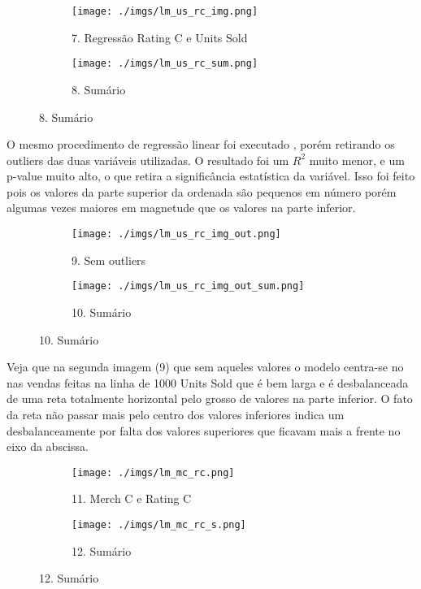 \documentclass[12pt, a4paper]{article}
\begin{document}
\FloatBarrier
\begin{figure}[h]
	\hspace{1cm}
  \begin{subfigure}[b]{0.4\textwidth}
    \texttt{[image: ./imgs/lm\_us\_rc\_img.png]}
    \caption*{7. Regressão Rating C e Units Sold}
    \label{fig:1}
  \end{subfigure}
  \hspace{0.25cm}
  \begin{subfigure}[b]{0.45\textwidth}
    \texttt{[image: ./imgs/lm\_us\_rc\_sum.png]}
    \caption*{8. Sumário}
    \label{fig:2}
  \end{subfigure}
\end{figure}
\FloatBarrier

O mesmo procedimento de regressão linear foi executado , porém retirando os outliers das duas variáveis utilizadas. O resultado foi um $R^{2}$ muito menor, e um p-value muito alto, o que retira a significância estatística da variável. Isso foi feito pois os valores da parte superior da ordenada são pequenos em número porém algumas vezes maiores em magnetude que os valores na parte inferior.

\FloatBarrier
\begin{figure}[h]
	\hspace{1cm}
  \begin{subfigure}[b]{0.4\textwidth}
    \texttt{[image: ./imgs/lm\_us\_rc\_img\_out.png]}
    \caption*{9. Sem outliers}
    \label{fig:1}
  \end{subfigure}
  \hspace{0.5cm}
  \begin{subfigure}[b]{0.5\textwidth}
    \texttt{[image: ./imgs/lm\_us\_rc\_img\_out\_sum.png]}
    \caption*{10. Sumário}
    \label{fig:2}
  \end{subfigure}
\end{figure}
\FloatBarrier

Veja que na segunda imagem (9) que sem aqueles valores o modelo centra-se no nas vendas feitas na linha de 1000 Units Sold que é bem larga e é desbalanceada de uma reta totalmente horizontal pelo grosso de valores na parte inferior. O fato da reta não passar mais pelo centro dos valores inferiores indica um desbalanceamente por falta dos valores superiores que ficavam mais a frente no eixo da abscissa.

\FloatBarrier
\begin{figure}[h]
  \begin{subfigure}[b]{0.4\textwidth}
    \texttt{[image: ./imgs/lm\_mc\_rc.png]}
    \caption*{11. Merch C e Rating C}
    \label{fig:1}
  \end{subfigure}
  \begin{subfigure}[b]{0.5\textwidth}
    \texttt{[image: ./imgs/lm\_mc\_rc\_s.png]}
    \caption*{12. Sumário}
    \label{fig:2}
  \end{subfigure}
\end{figure}
\FloatBarrier 
\end{document}
